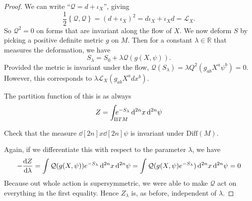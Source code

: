 \begin{proof}
  We can write ``$\mathcal{Q} = d + \iota_X$'', giving
  \begin{equation}
    \frac{1}{2} \left\{ \mathcal{Q}, \mathcal{Q} \right\} = (d + \iota_X)^2 = d \iota_X + \iota_X d = \mathcal{L}_X.
  \end{equation}
  So $\mathcal{Q}^2 = 0$ on forms that are invariant along the flow of $X$.
  We now deform $S$ by picking a positive definite metric $g$ on $M$. Then for a constant $\lambda \in \mathbb{R}$ that measures the deformation, we have
  \begin{equation}
    S_{\lambda} = S_0 + \lambda \mathcal{Q} (g(X, \psi)).
  \end{equation}
  Provided the metric is invariant under the flow, $\mathcal{Q}(S_{\lambda}) = \lambda Q^2 (g_{ab} X^{a} \psi^{b}) = 0$. However, this corresponds to $\lambda \mathcal{L}_X (g_{ab} X^{a} dx^{b})$.

  The partition function of this is as always
  \begin{equation}
    Z = \int_{\mathrlap{\Pi TM}} e^{-S_{\lambda}} \dd[2n]{x} \dd[2n]{\psi}
  \end{equation}
  \begin{exercise}
    Check that the measure $\dd[2n]{x} \dd[2n]{\psi}$ is invariant under $\text{Diff}(M)$.
  \end{exercise}
  Again, if we differentiate this with respect to the parameter $\lambda$, we have
  \begin{equation}
    -\dv{Z}{\lambda} = \int \mathcal{Q}(g(X, \psi)) e^{-S_\lambda} \dd[2n]{x} \dd[2n]{\psi}
    = \int \mathcal{Q} (g(X, \psi) e^{-S_\lambda}) \dd[2n]{x} \dd[2n]{\psi}  =0
  \end{equation} 
  Because out whole action is supersymmetric, we were able to make $\mathcal{Q}$ act on everything in the first equality.
  Hence $Z_\lambda$ is, as before, independent of $\lambda$.


\end{proof}
